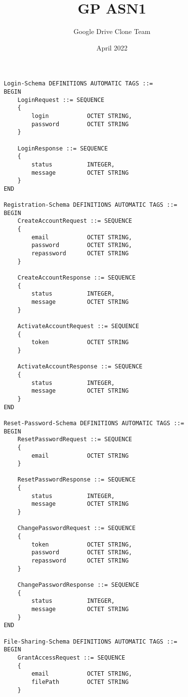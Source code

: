 \documentclass{article}
\title{GP ASN1}
\author{Google Drive Clone Team}
\date{April 2022}
\begin{document}
\maketitle

\begin{verbatim}
    Login-Schema DEFINITIONS AUTOMATIC TAGS ::= 
    BEGIN
        LoginRequest ::= SEQUENCE
        {
            login           OCTET STRING,
            password        OCTET STRING
        }
        
        LoginResponse ::= SEQUENCE
        {
            status          INTEGER,
            message         OCTET STRING
        }
    END
    
    Registration-Schema DEFINITIONS AUTOMATIC TAGS ::= 
    BEGIN
        CreateAccountRequest ::= SEQUENCE
        {
            email           OCTET STRING,
            password        OCTET STRING,
            repassword      OCTET STRING
        }
        
        CreateAccountResponse ::= SEQUENCE
        {
            status          INTEGER,
            message         OCTET STRING
        }
        
        ActivateAccountRequest ::= SEQUENCE
        {
            token           OCTET STRING
        }
        
        ActivateAccountResponse ::= SEQUENCE
        {
            status          INTEGER,
            message         OCTET STRING
        }
    END
    
    Reset-Password-Schema DEFINITIONS AUTOMATIC TAGS ::= 
    BEGIN
        ResetPasswordRequest ::= SEQUENCE
        {
            email           OCTET STRING
        }
        
        ResetPasswordResponse ::= SEQUENCE
        {
            status          INTEGER,
            message         OCTET STRING
        }
    
        ChangePasswordRequest ::= SEQUENCE
        {
            token           OCTET STRING,
            password        OCTET STRING,
            repassword      OCTET STRING
        }
        
        ChangePasswordResponse ::= SEQUENCE
        {
            status          INTEGER,
            message         OCTET STRING
        }
    END
    
    File-Sharing-Schema DEFINITIONS AUTOMATIC TAGS ::= 
    BEGIN
        GrantAccessRequest ::= SEQUENCE
        {
            email           OCTET STRING,
            filePath        OCTET STRING
        }
        

\end{verbatim}
\end{document}
